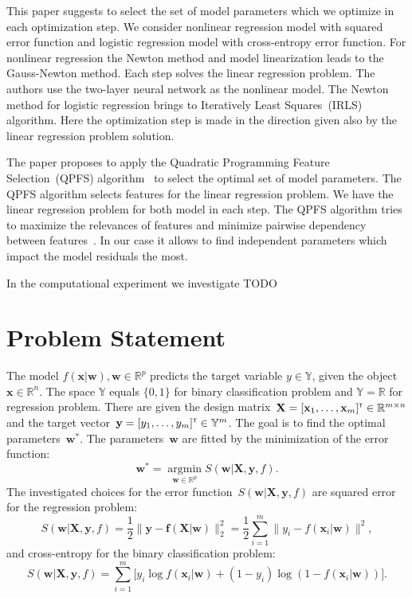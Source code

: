 \documentclass[a4paper,12pt]{article}
\theoremstyle{plain} %
\theoremstyle{definition} %
\theoremstyle{remark} %
\newcommand{\bw}{\mathbf{w}}
\newcommand{\by}{\mathbf{y}}
\newcommand{\bx}{\mathbf{x}}
\newcommand{\bbR}{\mathbb{R}}
\newcommand{\bbY}{\mathbb{Y}}
\newcommand{\bX}{\mathbf{X}}
\newcommand{\T}{{\text{\tiny\sffamily\upshape\mdseries T}}}
\newcommand{\argmin}{\mathop{\arg \min}\limits}
\begin{document}
	This paper suggests to select the set of model parameters which we optimize in each optimization step.
	We consider nonlinear regression model with squared error function and logistic regression model with cross-entropy error function.
	For nonlinear regression the Newton method and model linearization leads to the Gauss-Newton method. 
	Each step solves the linear regression problem. 
	The authors use the two-layer neural network as the nonlinear model. 
	The Newton method for logistic regression brings to Iteratively Least Squares~(IRLS) algorithm. 
	Here the optimization step is made in the direction given also by the linear regression problem solution.
	
	The paper proposes to apply the Quadratic Programming Feature Selection~(QPFS) algorithm~\cite{katrutsa2017comprehensive,rodriguez2010qpfs} to select the optimal set of model parameters. The QPFS algorithm selects features for the linear regression problem. We have the linear regression problem for both model in each step. The QPFS algorithm tries to maximize the relevances of features and minimize pairwise dependency between features~\cite{ding2005mrmr}. In our case it allows to find independent parameters which impact the model residuals the most.
	
	In the computational experiment we investigate {\color{red} TODO}
	
		
	\section*{Problem Statement}

	The model $f( \bx | \bw), \bw \in \mathbb{R}^p$ predicts the target variable $y \in \bbY$, given the object $\bx \in \bbR^{n}$. The space $\bbY$ equals $\{0, 1\}$ for binary classification problem and $\bbY = \bbR$ for regression problem.
	There are given the design matrix~$\bX = [\bx_1, \dots, \bx_m]^{\T} \in \bbR^{m \times n}$ and the target vector~$\by = [y_1, \dots, y_m]^{\T} \in \bbY^{m}$. 
	The goal is to find the optimal parameters~$\bw^*$.
	The parameters~$\bw$ are fitted by the minimization of the error function:
	\begin{equation}
		\bw^* = \argmin_{\bw \in \bbR^p} S(\bw | \bX, \by, f).
		\label{eq:error_function}
	\end{equation}
	The investigated choices for the error function~$S(\bw | \bX, \by, f)$ are
	squared error for the regression problem: 
		\begin{equation}
			S(\bw | \bX, \by, f) = \frac 12 \| \by - \mathbf{f}(\bX | \bw) \|_2^2 = \frac 12 \sum_{i=1}^m \| y_i - f(\bx_i | \bw)\|^2,
			\label{eq:squared_error}
		\end{equation}
	 and cross-entropy for the binary classification problem: 
		\begin{equation}
			S(\bw | \bX, \by, f) = \sum_{i=1}^m \bigl[y_i \log f (\bx_i | \bw) + (1-y_i) \log (1 - f (\bx_i | \bw))\bigr].
			\label{eq:log_loss}
		\end{equation}
	
\end{document}

